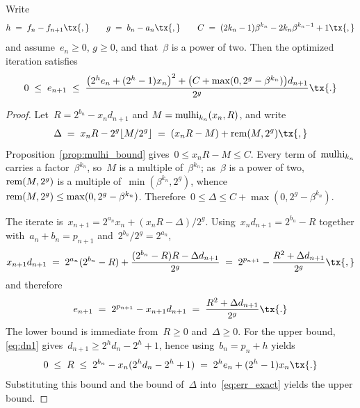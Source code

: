 \documentclass[12pt,oneside,draft]{scrartcl}
\begin{document}
\begin{proposition}
\label{prop:error_recursion}
Write
\begin{gather*}
  h
\;=\;
  f_{n} - f_{n + 1}
\tx{,}\qquad
  g
\;=\;
  b_{n} - a_{n}
\tx{,}\qquad
  C
\;=\;
  (2 k_{n} - 1) \beta^{k_{n}} - 2 k_{n} \beta^{k_{n} - 1} + 1
\tx{,}
\end{gather*}
and assume~$e_{n} \ge 0$, $g \ge 0$, and that~$\beta$ is a power of two.  Then the optimized iteration satisfies
\begin{gather}
  0
\;\le\;
  e_{n + 1}
\;\le\;
  \frac{\bigl(2^{h} e_{n} + (2^{h} - 1) x_{n}\bigr)^{2} + \bigl(C + \max(0, 2^{g} - \beta^{k_{n}})\bigr) d_{n + 1}}{2^{g}}
\tx{.}
\label{eq:error_recursion}
\end{gather}
\end{proposition}
\begin{proof}
Let~$R = 2^{b_{n}} - x_{n} d_{n + 1}$ and $M = \operatorname{mulhi}_{k_{n}}(x_{n}, R)$, and write
\begin{gather*}
  \Delta
\;=\;
  x_{n} R - 2^{g} \lfloor M / 2^{g} \rfloor
\;=\;
  (x_{n} R - M) + \rem(M, 2^{g})
\tx{,}
\end{gather*}
Proposition~\ref{prop:mulhi_bound} gives~$0 \le x_{n} R - M \le C$.  Every term of~$\operatorname{mulhi}_{k_{n}}$ carries a factor~$\beta^{k_{n}}$, so~$M$ is a multiple of~$\beta^{k_{n}}$; as~$\beta$ is a power of two, $\operatorname{rem}(M, 2^{g})$ is a multiple of~$\min(\beta^{k_{n}}, 2^{g})$, whence~$\operatorname{rem}(M, 2^{g}) \le \max(0, 2^{g} - \beta^{k_{n}})$.  Therefore~$0 \le \Delta \le C + \max(0, 2^{g} - \beta^{k_{n}})$.

The iterate is~$x_{n + 1} = 2^{a_{n}} x_{n} + (x_{n} R - \Delta) / 2^{g}$.  Using~$x_{n} d_{n + 1} = 2^{b_{n}} - R$ together with~$a_{n} + b_{n} = p_{n + 1}$ and~$2^{b_{n}} / 2^{g} = 2^{a_{n}}$,
\begin{gather*}
  x_{n + 1} d_{n + 1}
\;=\;
  2^{a_{n}} (2^{b_{n}} - R) + \frac{(2^{b_{n}} - R) R - \Delta d_{n + 1}}{2^{g}}
\;=\;
  2^{p_{n + 1}} - \frac{R^{2} + \Delta d_{n + 1}}{2^{g}}
\tx{,}
\end{gather*}
and therefore
\begin{gather}
  e_{n + 1}
\;=\;
  2^{p_{n + 1}} - x_{n + 1} d_{n + 1}
\;=\;
  \frac{R^{2} + \Delta d_{n + 1}}{2^{g}}
\tx{.}
\label{eq:err_exact}
\end{gather}
The lower bound is immediate from~$R \ge 0$ and~$\Delta \ge 0$.  For the upper bound, \eqref{eq:dn1} gives~$d_{n + 1} \ge 2^{h} d_{n} - 2^{h} + 1$, hence using~$b_{n} = p_{n} + h$ yields
\begin{gather*}
  0
\;\le\;
  R
\;\le\;
  2^{b_{n}} - x_{n} (2^{h} d_{n} - 2^{h} + 1)
\;=\;
  2^{h} e_{n} + (2^{h} - 1) x_{n}
\tx{.}
\end{gather*}
Substituting this bound and the bound of~$\Delta$ into~\eqref{eq:err_exact} yields the upper bound.
\end{proof}
\fi
\end{document}
